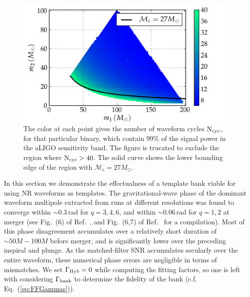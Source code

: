 
\begin{figure}
\centering
\includegraphics[width=1.1\columnwidth]{BBHm1m2_tlen_Ncyc40_0-99_Mchirp27_cropped-tiny.png}%
\caption{The color at each point gives the number 
of waveform cycles $\mathrm{N}_{\mathrm{cyc}}$, for that particular binary, which contain 
$99\%$ of the signal power in the aLIGO sensitivity band. The figure is 
trucated to exclude the region where $\mathrm{N}_{\mathrm{cyc}}>40$. The solid curve shows
the lower bounding edge of the region with $\mathcal{M}_c = 27M_\odot$.}
\label{fig:BBHregion}
\end{figure}

In this section we demonstrate the effectualness of a template bank viable
for using NR waveforms as templates. The gravitational-wave phase of the dominant 
waveform multipole 
extracted from runs at different resolutions was found to converge within 
$\sim 0.3\,\mathrm{rad}$ for $q=3,4,6$, and within $\sim 0.06\,\mathrm{rad}$
for $q=1,2$ at merger (see Fig.~(6) of Ref.~\cite{Buchman:2012dw}, and 
Fig.~(6,7) of Ref.~\cite{BuonannoEOBv2Main} for a compilation). Most of this 
phase disagreement accumulates over a relatively short duration of 
$\sim 50M  - 100M$ before merger, and is significantly lower over the preceding
inspiral and plunge. As the matched-filter SNR accumulates secularly over the
entire waveform, 
these numerical phase errors are negligible in terms of mismatches. We set
$\Gamma_{\mathrm{Hyb}} = 0$ while computing the fitting factors, so one is left with
considering $\Gamma_{\mathrm{bank}}$ to determine the fidelity of the bank (c.f.
Eq.~(\ref{eq:FFGammas})).

